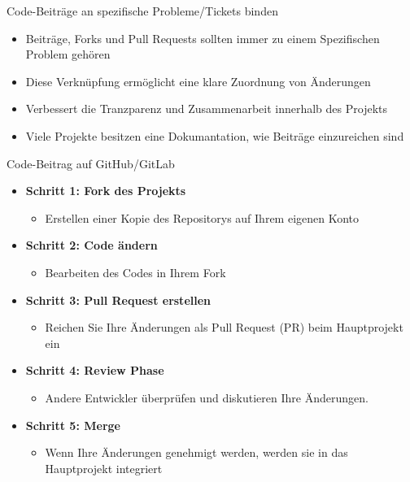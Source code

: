 \documentclass[compress,aspectratio=169]{beamer}
\begin{document}
	\begin{frame}{Code-Beiträge an spezifische Probleme/Tickets binden}
		\begin{itemize}
			\item Beiträge, Forks und Pull Requests sollten immer zu einem Spezifischen Problem gehören
			\item Diese Verknüpfung ermöglicht eine klare Zuordnung von Änderungen
			\item Verbessert die Tranzparenz und Zusammenarbeit innerhalb des Projekts
			\vspace{2em}
			\item Viele Projekte besitzen eine Dokumantation, wie Beiträge einzureichen sind
		\end{itemize}
	\end{frame}
	
	\begin{frame}{Code-Beitrag auf GitHub/GitLab}
		\begin{itemize}
			\item \textbf{Schritt 1: Fork des Projekts}
				\begin{itemize}
					\item Erstellen einer Kopie des Repositorys auf Ihrem eigenen Konto
				\end{itemize}
			\item \textbf{Schritt 2: Code ändern}
				\begin{itemize}
					\item Bearbeiten des Codes in Ihrem Fork
				\end{itemize}
			\item \textbf{Schritt 3: Pull Request erstellen}
				\begin{itemize}
					\item Reichen Sie Ihre Änderungen als Pull Request (PR) beim Hauptprojekt ein
				\end{itemize}
			\item \textbf{Schritt 4: Review Phase}
				\begin{itemize}
					\item Andere Entwickler überprüfen und diskutieren Ihre Änderungen.
				\end{itemize}
			\item \textbf{Schritt 5: Merge}
				\begin{itemize}
					\item Wenn Ihre Änderungen genehmigt werden, werden sie in das Hauptprojekt integriert
				\end{itemize}
		\end{itemize}
	\end{frame}	
	
\end{document}
